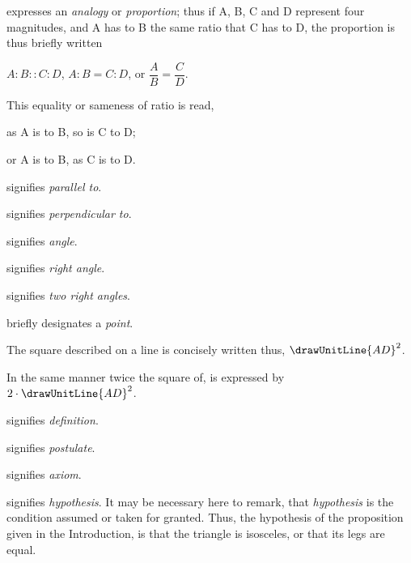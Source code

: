\symb{$:\ ::\ :$}
 expresses an \emph{analogy} or \emph{proportion}; thus if A, B, C and D represent four magnitudes, and A has to B the same ratio that C has to D, the proportion is thus briefly written

$A : B :: C : D$, $A : B = C : D$, or $\dfrac{A}{B} = \dfrac{C}{D}$.

This equality or sameness of ratio is read,

as A is to B, so is C to D;

or A is to B, as C is to D.

\symb{$\parallel$}
 signifies \emph{parallel to}.

\symb{$\perp$}
 signifies \emph{perpendicular to}.


 signifies \emph{angle}.

 signifies \emph{right angle}.

\symb{\drawTwoRightAngles}
 signifies \emph{two right angles}.



briefly designates a \emph{point}.

The square described on a line is concisely written thus, $\drawUnitLine{AD}^2$.

In the same manner twice the square of, is expressed by $2 \cdot \drawUnitLine{AD}^2$.

\symb{\indefstr}
 signifies \emph{definition}.

\symb{\inpoststr}
 signifies \emph{postulate}.

\symb{\inaxstr}
 signifies \emph{axiom}.

 signifies \emph{hypothesis}. It may be necessary here to remark, that \emph{hypothesis} is the condition assumed or taken for granted. Thus, the hypothesis of the proposition given in the Introduction, is that the triangle is isosceles, or that its legs are equal.

